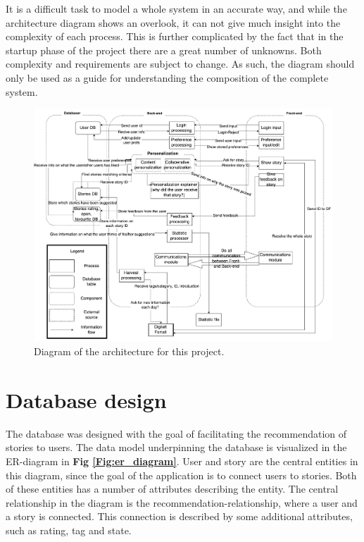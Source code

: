 It is a difficult task to model a whole system in an accurate way, and while the architecture diagram shows an overlook, it can not give much insight into the complexity of each process. This is further complicated by the fact that in the startup phase of the project there are a great number of unknowns. Both complexity and requirements are subject to change. As such, the diagram should only be used as a guide for understanding the composition of the complete system.

\begin{figure}[h!]
	\centering
	\includegraphics[width=\textwidth]{pdffig/architecture}
	\caption{Diagram of the architecture for this project.}
	\label{Fig:architecture}
\end{figure}

\section{Database design}
\label{sec:database_design}

The database was designed with the goal of facilitating the recommendation of stories to users. The data model underpinning the database is visualized in the ER-diagram in \textbf{Fig \ref{Fig:er_diagram}}. User and story are the central entities in this diagram, since the goal of the application is to connect users to stories. Both of these entities has a number of attributes describing the entity. The central relationship in the diagram is the recommendation-relationship, where a user and a story is connected. This connection is described by some additional attributes, such as rating, tag and state. \newline

